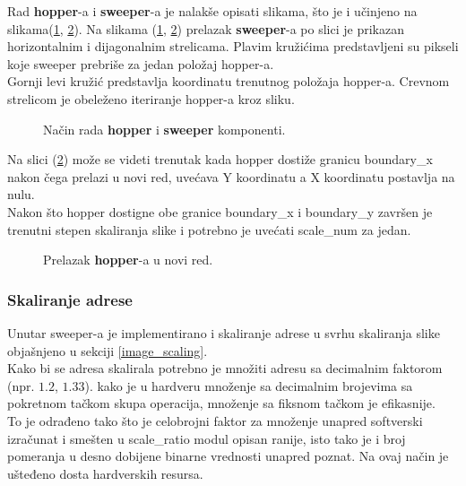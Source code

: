 Rad \textbf{hopper}-a i \textbf{sweeper}-a je nalakše opisati slikama, što je i
učinjeno na slikama(\ref{hop_sweep1}, \ref{hop_sweep2}).
Na slikama (\ref{hop_sweep1}, \ref{hop_sweep2}) prelazak \textbf{sweeper}-a po slici je
prikazan horizontalnim i dijagonalnim strelicama.
Plavim kružićima predstavljeni su pikseli koje sweeper prebriše za jedan
položaj hopper-a.\\

Gornji levi kružić predstavlja koordinatu trenutnog položaja hopper-a.
Crevnom strelicom je obeleženo iteriranje hopper-a kroz sliku. \\

\begin{figure}[H]
  \centering
    \resizebox{\textwidth}{!}{%
    
    
    }
\caption{Način rada \textbf{hopper} i \textbf{sweeper} komponenti.}
\label{hop_sweep1}
\end{figure}

Na slici (\ref{hop_sweep2}) može se videti trenutak kada hopper dostiže granicu
boundary\_x nakon čega prelazi u novi red, uvećava Y koordinatu a X koordinatu
postavlja na nulu. \\

Nakon što hopper dostigne obe granice boundary\_x i boundary\_y završen je
trenutni stepen skaliranja slike i potrebno je uvećati scale\_num za jedan.

\begin{figure}[H]
  \centering
  \resizebox{\textwidth}{!}{%
    
    
    }
\caption{Prelazak \textbf{hopper}-a u novi red.}
\label{hop_sweep2}
\end{figure}

\subsubsection{Skaliranje adrese}\label{address_scaling_sec}

Unutar sweeper-a je implementirano i skaliranje adrese u svrhu skaliranja slike
objašnjeno u sekciji \ref{image_scaling}. \\
Kako bi se adresa skalirala potrebno je množiti adresu sa decimalnim faktorom (npr. $1.2$, $1.33$).
kako je u hardveru množenje sa decimalnim brojevima sa pokretnom tačkom skupa operacija,
množenje sa fiksnom tačkom je efikasnije. \\
To je odrađeno tako što je celobrojni faktor za množenje unapred softverski izračunat i smešten
u scale\_ratio modul opisan ranije, isto tako je i broj pomeranja u desno dobijene binarne
vrednosti unapred poznat.
Na ovaj način je ušteđeno dosta hardverskih resursa. \\


